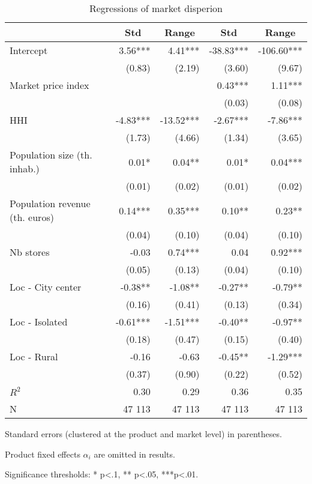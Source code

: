 \documentclass[english]{article}
\begin{document}
\begin{table}[htbp]
\caption{Regressions of market disperion}
\label{tab:reg_market_dispersion}
\begin{threeparttable}
    \begin{tabular}{lrrrr}
    \toprule
    \toprule
          & \multicolumn{1}{c}{Std} & \multicolumn{1}{c}{Range} & \multicolumn{1}{c}{Std} & \multicolumn{1}{c}{Range} \\
    \midrule
Intercept & 3.56*** & 4.41*** & -38.83*** & -106.60*** \\
      & (0.83) & (2.19) & (3.60) & (9.67) \\
Market price index &       &       & 0.43*** & 1.11*** \\
      &       &       & (0.03) & (0.08) \\
HHI   & -4.83*** & -13.52*** & -2.67*** & -7.86*** \\
      & (1.73) & (4.66) & (1.34) & (3.65) \\
Population size (th. inhab.) & 0.01* & 0.04** & 0.01* & 0.04*** \\
      & (0.01) & (0.02) & (0.01) & (0.02) \\
Population revenue (th. euros) & 0.14*** & 0.35*** & 0.10** & 0.23** \\
      & (0.04) & (0.10) & (0.04) & (0.10) \\
Nb stores & -0.03 & 0.74*** & 0.04  & 0.92*** \\
      & (0.05) & (0.13) & (0.04) & (0.10) \\
Loc - City center & -0.38** & -1.08** & -0.27** & -0.79** \\
      & (0.16) & (0.41) & (0.13) & (0.34) \\
Loc - Isolated & -0.61*** & -1.51*** & -0.40** & -0.97** \\
      & (0.18) & (0.47) & (0.15) & (0.40) \\
Loc - Rural & -0.16 & -0.63 & -0.45** & -1.29*** \\
      & (0.37) & (0.90) & (0.22) & (0.52) \\
\midrule
$R^2$    & 0.30  & 0.29  & 0.36  & 0.35 \\
N     & 47 113 & 47 113 & 47 113 & 47 113 \\
    \bottomrule
    \bottomrule
\end{tabular}
\begin{tablenotes}
      \small
	  \item Standard errors (clustered at the product and market level) in parentheses.
    \item Product fixed effects $\alpha_i$ are omitted in results.
	  \item Significance thresholds: * p<.1, ** p<.05, ***p<.01.
\end{tablenotes}
\end{threeparttable}
\end{table}
\end{document}
